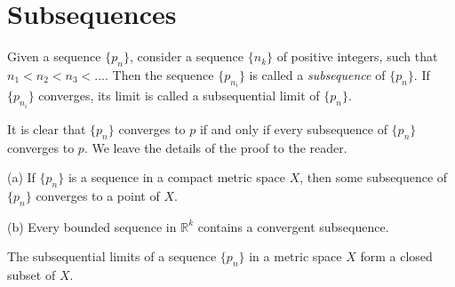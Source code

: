 
\section{Subsequences}
\begin{myDef}\label{myDef:3.5 Subsequence}
    Given a sequence $\{p_n\}$, consider a sequence $\{n_k\}$ of positive integers, such that $n_1 <n_2 <n_3 <....$ Then the sequence $\{p_{n_i}\}$ is called a \emph{subsequence} of $\{p_n\}$. If $\{p_{n_i}\}$ converges, its limit is called a subsequential limit of $\{p_n\}$.
\end{myDef}
It is clear that $\{p_n\}$ converges to $p$ if and only if every subsequence of $\{p_{n}\}$ converges to $p$. We leave the details of the proof to the reader.

\begin{thm}\label{thm:3.6}
    (a) If $\{p_{n}\}$ is a sequence in a compact metric space $X$, then some subsequence of $\{p_{n}\}$ converges to a point of $X$.

    (b) Every bounded sequence in $\mathbb{R}^k$ contains a convergent subsequence.
\end{thm}

\begin{thm}\label{thm:3.7}
    The subsequential limits of a sequence $\{p_{n}\}$  in a metric space $X$ form a closed subset of $X$.
\end{thm}

